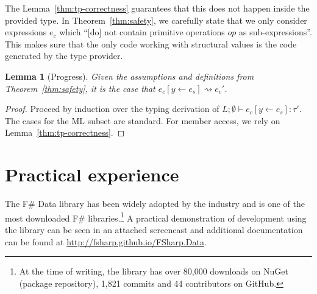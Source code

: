 \documentclass[10pt,preprint,blind,clearpagebib]{sigplanconf}
\newcommand{\reduce}{\rightsquigarrow}
\newtheorem{lemma}[theorem]{Lemma}
\begin{document}
The Lemma~\ref{thm:tp-correctness} guarantees that this does not happen inside the provided type.
In Theorem~\ref{thm:safety}, we carefully state that we only consider expressions $e_c$ which 
``[do] not contain primitive operations $op$ as sub-expressions''. This makes sure that the only 
code working with structural values is the code generated by the type provider.

\begin{lemma}[Progress]
\label{thm:rs-progress}
Given the assumptions and definitions from Theorem~\ref{thm:safety}, it is the case that
$e_c[y\leftarrow e_s] \reduce e_c'$.
\end{lemma}
\begin{proof}
Proceed by induction over the typing derivation of $L; \emptyset \vdash e_c[y\leftarrow e_s] : \tau'$. 
The cases for the ML subset are standard. For member access, we rely on Lemma~\ref{thm:tp-correctness}.
\end{proof}



%
%

\section{Practical experience}
\label{sec:impl}

The F\# Data library has been widely adopted by the industry and is one of the most downloaded
F\# libraries.\footnote{At the time of writing, the library has over 80,000 downloads on NuGet 
(package repository), 1,821 commits and 44 contributors on GitHub.} A practical demonstration of 
development using the library can be seen in an attached screencast and additional documentation can be
found at \url{http://fsharp.github.io/FSharp.Data}.
\end{document}
